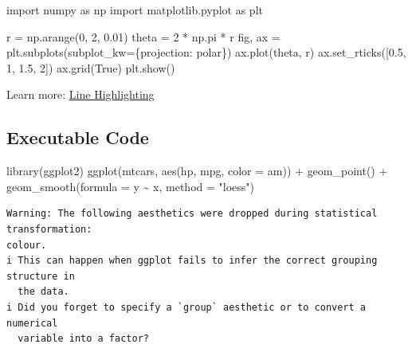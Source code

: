 \documentclass[
  letterpaper,
  DIV=11,
  numbers=noendperiod]{scrartcl}
\newenvironment{Shaded}{\begin{snugshade}}{\end{snugshade}}
\newcommand{\AttributeTok}[1]{\textcolor[rgb]{0.40,0.45,0.13}{#1}}
\newcommand{\DecValTok}[1]{\textcolor[rgb]{0.68,0.00,0.00}{#1}}
\newcommand{\FloatTok}[1]{\textcolor[rgb]{0.68,0.00,0.00}{#1}}
\newcommand{\FunctionTok}[1]{\textcolor[rgb]{0.28,0.35,0.67}{#1}}
\newcommand{\ImportTok}[1]{\textcolor[rgb]{0.00,0.46,0.62}{#1}}
\newcommand{\NormalTok}[1]{\textcolor[rgb]{0.00,0.23,0.31}{#1}}
\newcommand{\OperatorTok}[1]{\textcolor[rgb]{0.37,0.37,0.37}{#1}}
\newcommand{\SpecialCharTok}[1]{\textcolor[rgb]{0.37,0.37,0.37}{#1}}
\newcommand{\StringTok}[1]{\textcolor[rgb]{0.13,0.47,0.30}{#1}}
\newcommand{\VariableTok}[1]{\textcolor[rgb]{0.07,0.07,0.07}{#1}}
\begin{document}
\begin{Shaded}
\begin{Highlighting}[numbers=left,,]
\ImportTok{import}\NormalTok{ numpy }\ImportTok{as}\NormalTok{ np}
\ImportTok{import}\NormalTok{ matplotlib.pyplot }\ImportTok{as}\NormalTok{ plt}

\NormalTok{r }\OperatorTok{=}\NormalTok{ np.arange(}\DecValTok{0}\NormalTok{, }\DecValTok{2}\NormalTok{, }\FloatTok{0.01}\NormalTok{)}
\NormalTok{theta }\OperatorTok{=} \DecValTok{2} \OperatorTok{*}\NormalTok{ np.pi }\OperatorTok{*}\NormalTok{ r}
\NormalTok{fig, ax }\OperatorTok{=}\NormalTok{ plt.subplots(subplot\_kw}\OperatorTok{=}\NormalTok{\{}\StringTok{\textquotesingle{}projection\textquotesingle{}}\NormalTok{: }\StringTok{\textquotesingle{}polar\textquotesingle{}}\NormalTok{\})}
\NormalTok{ax.plot(theta, r)}
\NormalTok{ax.set\_rticks([}\FloatTok{0.5}\NormalTok{, }\DecValTok{1}\NormalTok{, }\FloatTok{1.5}\NormalTok{, }\DecValTok{2}\NormalTok{])}
\NormalTok{ax.grid(}\VariableTok{True}\NormalTok{)}
\NormalTok{plt.show()}
\end{Highlighting}
\end{Shaded}

Learn more:
\href{https://?meta:prerelease-subdomainquarto.org/docs/presentations/revealjs/\#line-highlighting}{Line
Highlighting}

\subsection{Executable Code}\label{executable-code}

\begin{Shaded}
\begin{Highlighting}[]
\FunctionTok{library}\NormalTok{(ggplot2)}
\FunctionTok{ggplot}\NormalTok{(mtcars, }\FunctionTok{aes}\NormalTok{(hp, mpg, }\AttributeTok{color =}\NormalTok{ am)) }\SpecialCharTok{+}
  \FunctionTok{geom\_point}\NormalTok{() }\SpecialCharTok{+}
  \FunctionTok{geom\_smooth}\NormalTok{(}\AttributeTok{formula =}\NormalTok{ y }\SpecialCharTok{\textasciitilde{}}\NormalTok{ x, }\AttributeTok{method =} \StringTok{"loess"}\NormalTok{)}
\end{Highlighting}
\end{Shaded}

\begin{verbatim}
Warning: The following aesthetics were dropped during statistical transformation:
colour.
i This can happen when ggplot fails to infer the correct grouping structure in
  the data.
i Did you forget to specify a `group` aesthetic or to convert a numerical
  variable into a factor?
\end{verbatim}
\end{document}
